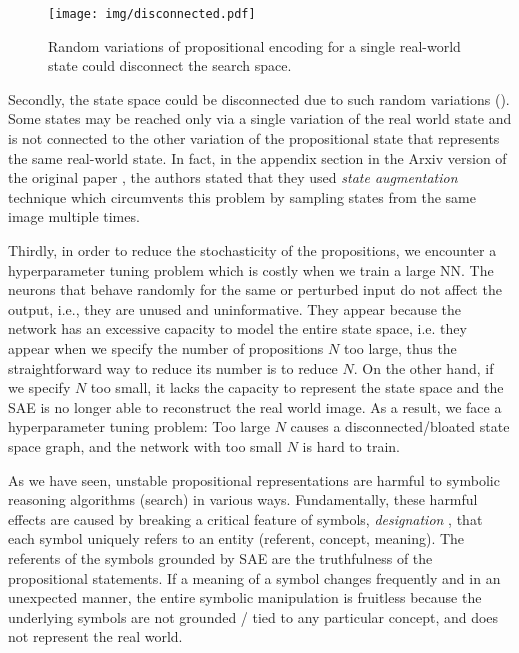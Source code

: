 \begin{figure}[tb]
 \centering
 \texttt{[image: img/disconnected.pdf]}
 \caption{Random variations of propositional encoding for a single real-world state could disconnect the search space.}
 \label{disconnected}
\end{figure}

Secondly, the state space could be disconnected due to such random variations ().
Some states may be reached only via a single variation of the real world state and is not connected to the
other variation of the propositional state that represents the same real-world state.
In fact, in the appendix section in the Arxiv version of the original paper \cite{Asai2018},
the authors stated that they used \emph{state augmentation} technique
which circumvents this problem by sampling states from the same image multiple times.

Thirdly, in order to reduce the stochasticity of the propositions, we encounter a hyperparameter tuning problem
which is costly when we train a large NN.
% 
The neurons that behave randomly for the same or perturbed input do not affect the output,
i.e., they are unused and uninformative.
They appear because the network has an excessive capacity to 
model the entire state space, i.e. they appear when we specify the number of propositions $N$ too large,
thus the straightforward way to reduce its number is to reduce $N$.
On the other hand, if we specify $N$ too small, it lacks the capacity to represent the state space
and the SAE is no longer able to reconstruct the real world image.
As a result, we face a hyperparameter tuning problem: Too large $N$ causes a disconnected/bloated state space graph,
and the network with too small $N$ is hard to train.


As we have seen, unstable propositional representations are harmful to symbolic reasoning algorithms (search)
in various ways.
Fundamentally,
these harmful effects are caused by breaking a critical feature of symbols, \emph{designation} \cite{newell1976computer,newell1980physical},
that each symbol uniquely refers to an entity (referent, concept, meaning).
The referents of the symbols grounded by SAE are the truthfulness of the propositional statements.
If a meaning of a symbol changes frequently and in an unexpected manner, the entire symbolic manipulation is fruitless
because the underlying symbols are not grounded / tied to any particular concept, and does not represent the real world.


